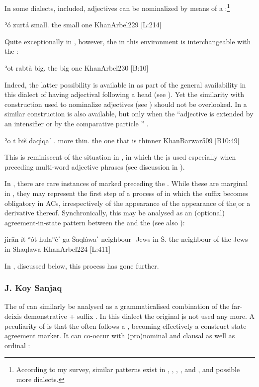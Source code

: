 {In some  dialects, \Arb included, adjectives can be nominalized by means of a \dem*:\footnote{According to my survey, similar patterns exist in   \Amd,  \Barw, \CArd, \Diy, \JZax and \Qar, and possible more dialects.}

{ʾó zurtá}
{\dem{} small.\fem}
{the small one}
{KhanArbel}{229 {[L:214]}}


Quite exceptionally in \Arb, however, the \dem* in this environment is interchangeable with the \lnk* {}:


{ʾot\cb{} rabtà}
{\lnk\cb{} big.\fem}
{the big one}
{KhanArbel}{230 {[B:10]}}

Indeed, the latter possibility is available in \Arb as part of the general availability in this dialect of having adjectival \secns following a \cst* head (see ). Yet  the similarity with \Sor \lnk* \ez* construction used to nominalize adjectives (see ) should not be overlooked. In \Barw a similar construction is also available, but only when the \secn \enquote{adjective is extended by an intensifier or by the comparative particle } \citep[509]{KhanBarwar}. 

{ʾo \cb{}t biš\cb{} daqìqaˈ}
{.\masc{} \cb{}\lnk{} more\cb{} thin.\fem}
{the one that is thinner}
{KhanBarwar}{509 {[B10:49]}}


This is reminiscent of the situation in \Syr, in which the \lnk* \d is used especially when preceding multi-word adjective phrases (see discussion in ). 



In \Arb, there are rare instances of \cst* marked \prims preceding the \lnk*. While these are marginal in \Arb, they may represent the first step of a process of  in which the \cst* \ed suffix becomes obligatory in ACs, irrespectively of the appearance of the appearance of the \d \lnk* or a derivative thereof. Synchronically, this may be analysed as an (optional) agreement-in-state pattern between the \prim and the \lnk*  (see also ):

{jirān-ít ʾót hulaʾèˈ ga\cb{} Šaqlàwaˈ}
{neighbour-\cst{} \lnk{} Jews in\cb{} Š.}
{the neighbour of the Jews in Shaqlawa}
{KhanArbel}{224 {[L:411]}}

In \Koy, discussed below, this process has gone further.

\subsubsection{J. Koy Sanjaq} The \lnk* {} of \Koy can similarly be analysed as a grammaticalised combination of the far-deixis demonstrative  + \cst* suffix . In this dialect the original \lnk* \d is not used any more. A peculiarity of \Koy is that the \lnk* often follows a \cst* \prim, becoming effectively a construct state agreement marker. It can co-occur with (pro)nominal and clausal as well as ordinal \secns:  

}
